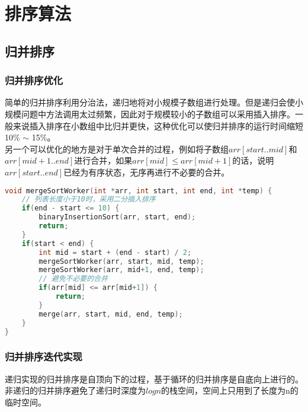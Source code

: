 \chapter{排序算法}

\section{归并排序}

\subsection{归并排序优化}

简单的归并排序利用分治法，递归地将对小规模子数组进行处理。但是递归会使小规模问题中方法调用太过频繁，因此对于规模较小的子数组可以采用插入排序。一般来说插入排序在小数组中比归并更快，这种优化可以使归并排序的运行时间缩短10\% $ \sim $ 15\%。\\

另一个可以优化的地方是对于单次合并的过程，例如将子数组$ arr[start..mid] $和$ arr[mid+1..end] $进行合并，如果$ arr[mid] \le arr[mid+1] $的话，说明$ arr[start..end] $已经为有序状态，无序再进行不必要的合并。\\


\begin{lstlisting}[language=C]
void mergeSortWorker(int *arr, int start, int end, int *temp) {
    // 列表长度小于10时，采用二分插入排序
    if(end - start <= 10) {
        binaryInsertionSort(arr, start, end);
        return;
    }
    if(start < end) {
        int mid = start + (end - start) / 2;
        mergeSortWorker(arr, start, mid, temp);
        mergeSortWorker(arr, mid+1, end, temp);
        // 避免不必要的合并
        if(arr[mid] <= arr[mid+1]) {
            return;
        }
        merge(arr, start, mid, end, temp);
    }
}
\end{lstlisting}

\vspace{0.5cm}

\subsection{归并排序迭代实现}

递归实现的归并排序是自顶向下的过程，基于循环的归并排序是自底向上进行的。非递归的归并排序避免了递归时深度为$ logn $的栈空间，空间上只用到了长度为n的临时空间。\\



